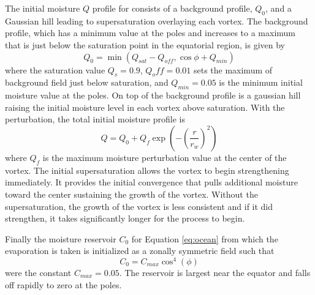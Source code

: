   The initial moisture $Q$ profile for consists of a background profile, $Q_0$, and a 
  Gaussian hill leading to supersaturation overlaying each vortex. 
  The background profile, which has a minimum value at the poles and increases to a 
  maximum that is just below the saturation point in the equatorial region, is given by
   \begin{equation}
    \label{eq:q0} Q_0 = \min(Q_{sat} - Q_{off}, \cos\phi + Q_{min})
  \end{equation}
  where the saturation value $Q_s=0.9$, $Q_off= 0.01$ sets the maximum of 
  background field just below saturation, and $Q_{min} = 0.05$ is the minimum initial moisture
  value at the poles. On top of the background profile is a gaussian hill raising the initial moisture
  level in each vortex above saturation. With the perturbation,
   the total initial moisture profile is
   \begin{equation}
    \label{eq:q} Q = Q_0 + Q_{f}\exp{\left(-\left(\frac{r}
    {r_w}\right)^2\right)}
   \end{equation} 
   where $Q_f$ is the maximum moisture perturbation value at the center of the vortex.
   The initial supersaturation allows the vortex to begin strengthening immediately. It 
   provides the initial convergence that pulls additional moisture toward the center sustaining 
   the growth of the vortex.  Without the supersaturation, the growth of the vortex is less consistent
   and if it did strengthen, it takes significantly longer for the process to begin. 
   
    Finally the moisture reservoir $C_0$ for Equation \ref{eq:ocean} from which the evaporation is taken
    is initialized as a zonally symmetric field such that
   \begin{equation}
     \label{eq:s0} C_0 = C_{max} \cos^4(\phi)
   \end{equation}
   were the constant $C_{max}= 0.05$. The reservoir is largest near the equator and 
   falls off rapidly to zero at the poles.
     
